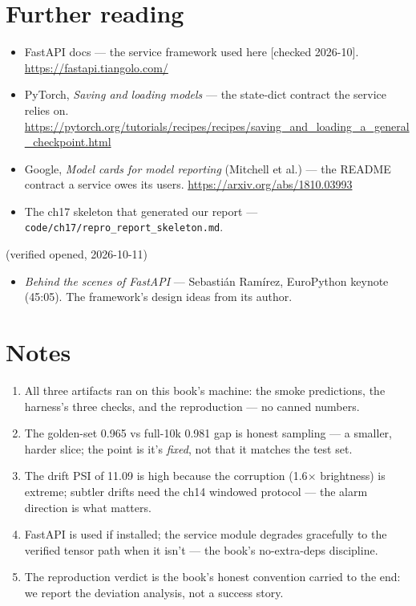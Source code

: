 \section*{Further reading}
\label{sec:further18}
\begin{itemize}
\item FastAPI docs --- the service framework used here [checked
2026-10].
\url{https://fastapi.tiangolo.com/}
\item PyTorch, \emph{Saving and loading models} --- the state-dict
contract the service relies on.
\url{https://pytorch.org/tutorials/recipes/recipes/saving_and_loading_a_general_checkpoint.html}
\item Google, \emph{Model cards for model reporting} (Mitchell et
al.) --- the README contract a service owes its users.
\url{https://arxiv.org/abs/1810.03993}
\item The ch17 skeleton that generated our report ---
\texttt{code/ch17/repro\_report\_skeleton.md}.
\end{itemize}

\begin{rulebox}
(verified opened, 2026-10-11)
\begin{itemize}
\item \emph{Behind the scenes of FastAPI} --- Sebastián Ramírez,
EuroPython keynote (45:05). The framework's design ideas from its
author.
\end{itemize}
\end{rulebox}

\section*{Notes}
\begin{enumerate}
\item[\textbf{1.}] All three artifacts ran on this book's machine:
the smoke predictions, the harness's three checks, and the
reproduction --- no canned numbers.
\item[\textbf{2.}] The golden-set 0.965 vs full-10k 0.981 gap is
honest sampling --- a smaller, harder slice; the point is it's
\emph{fixed}, not that it matches the test set.
\item[\textbf{3.}] The drift PSI of 11.09 is high because the
corruption (1.6$\times$ brightness) is extreme; subtler drifts
need the ch14 windowed protocol --- the alarm direction is what
matters.
\item[\textbf{4.}] FastAPI is used if installed; the service
module degrades gracefully to the verified tensor path when it
isn't --- the book's no-extra-deps discipline.
\item[\textbf{5.}] The reproduction verdict is the book's honest
convention carried to the end: we report the deviation analysis,
not a success story.
\end{enumerate}

